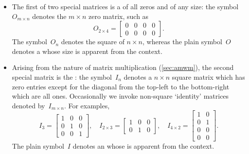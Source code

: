 \begin{itemize}
\item The first of two special matrices is a  of all zeros and of any size: the symbol~\(O_{m\times n}\) denotes the \(m\times n\) zero matrix, such as
\begin{equation*}
O_{2\times 4}=\begin{bmatrix} 0&0&0&0\\0&0&0&0 \end{bmatrix}.
\end{equation*}
The symbol~\(O_n\) denotes the square  of  \(n\times n\), whereas the plain symbol~\(O\) denotes a  whose size is apparent from the context.

\item Arising from the nature of matrix multiplication (\autoref{sec:amwm}), the second special matrix is the : the symbol~\(I_n\) denotes a \(n\times n\) square matrix which has zero entries except for the diagonal from the top-left to the bottom-right which are all ones.
Occasionally we invoke non-square `identity' matrices denoted by~\(I_{m\times n}\).
For examples,
\begin{equation*}
I_3=\begin{bmatrix} 1&0&0\\0&1&0\\0&0&1 \end{bmatrix},\quad
I_{2\times3}=\begin{bmatrix} 1&0&0\\0&1&0\end{bmatrix},\quad
I_{4\times2}=\begin{bmatrix} 1&0\\0&1\\0&0\\0&0\end{bmatrix}.
\end{equation*}
The plain symbol~\(I\) denotes an  whose  is apparent from the context.


\end{itemize}
